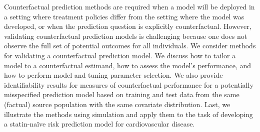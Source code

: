


Counterfactual prediction methods are required when a model will be deployed in a setting where treatment policies differ from the setting where the model was developed, or when the prediction question is explicitly counterfactual. However, validating counterfactual prediction models is challenging because one does not observe the full set of potential outcomes for all individuals. We consider methods for validating a counterfactual prediction model. We discuss how to tailor a model to a counterfactual estimand, how to assess the model's performance, and how to perform model and tuning parameter selection. We also provide identifiability results for measures of counterfactual performance for a potentially misspecified prediction model based on training and test data from the same (factual) source population with the same covariate distribution. Last, we illustrate the methods using simulation and apply them to the task of developing a statin-na\"{i}ve risk prediction model for cardiovascular disease. \\
